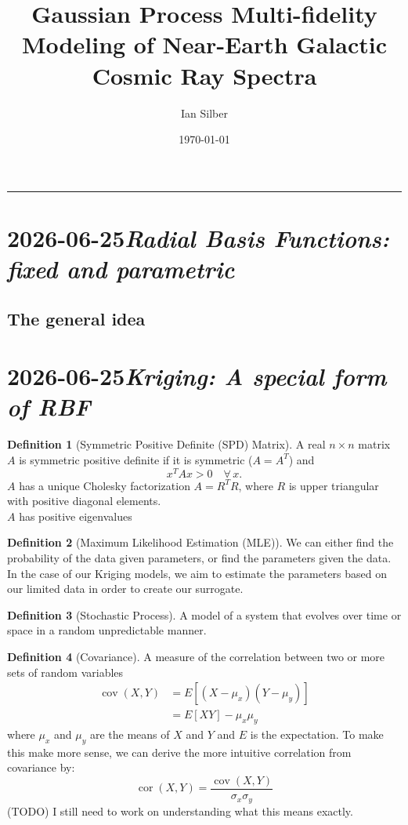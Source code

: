 \documentclass[11pt]{article}
\title{Gaussian Process Multi-fidelity Modeling of Near-Earth Galactic Cosmic Ray Spectra}
\author{Ian Silber}                      %
\date{\today}                  %
\newcommand{\entry}[2]{\clearpage\section[#2]{#1\quad\textnormal{\textit{#2}}}}
\newcommand{\subentry}[1]{\subsection{#1}}
\theoremstyle{definition}
\newtheorem{definition}{Definition}
\begin{document}
\maketitle
\tableofcontents               %
\vspace{1em}\hrule\vspace{1em}

\entry{2026-06-25}{Radial Basis Functions: fixed and parametric}
\subentry{The general idea}

\entry{2026-06-25}{Kriging: A special form of RBF}

\begin{definition}[Symmetric Positive Definite (SPD) Matrix]
  A real $n \times n$ matrix $A$ is symmetric positive definite if it is
  symmetric ($A = A^T$) and
  \[
    x^T A x > 0 \quad \forall\, x.
  \]
  $A$ has a unique Cholesky factorization $A = R^TR$, where $R$ is upper triangular with positive diagonal elements.
  \\
  $A$ has positive eigenvalues
\end{definition}

\begin{definition}[Maximum Likelihood Estimation (MLE)]
    We can either find the probability of the data given parameters, or find
    the parameters given the data. In the case of our Kriging models, we aim to estimate the parameters based on
    our limited data in order to create our surrogate.
\end{definition}

\begin{definition}[Stochastic Process]
    A model of a system that evolves over time or space in a random unpredictable manner.
\end{definition}

\begin{definition}[Covariance]
A measure of the correlation between two or more sets of random variables
\begin{align}
\operatorname{cov}(X,Y) &= E[(X - \mu_x)(Y - \mu_y)] \\
                        &= E[XY] - \mu_x\mu_y
\label{eq:covariance}
\end{align}
where $\mu_x$ and $\mu_y$ are the means of $X$ and $Y$ and $E$ is the expectation. To make this make more sense,
we can derive the more intuitive correlation from covariance by:
\begin{equation}
\operatorname{cor}(X,Y) = \frac{\operatorname{cov}(X,Y)}{\sigma_x\sigma_y}
\label{eq:correlation}
\end{equation}
(TODO) I still need to work on understanding what this means exactly.
\end{definition}
\end{document}
